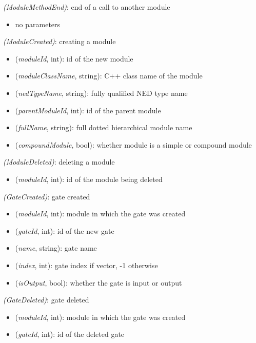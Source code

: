  \textit{(ModuleMethodEnd)}: end of a call to another module

\begin{itemize}
  \item no parameters
\end{itemize}

 \textit{(ModuleCreated)}: creating a module

\begin{itemize}
  \item {} (\textit{moduleId}, int): id of the new module
  \item {} (\textit{moduleClassName}, string): C++ class name of the module
  \item {} (\textit{nedTypeName}, string): fully qualified NED type name
  \item {} (\textit{parentModuleId}, int): id of the parent module
  \item {} (\textit{fullName}, string): full dotted hierarchical module name
  \item {} (\textit{compoundModule}, bool): whether module is a simple or compound module
\end{itemize}

 \textit{(ModuleDeleted)}: deleting a module

\begin{itemize}
  \item {} (\textit{moduleId}, int): id of the module being deleted
\end{itemize}

 \textit{(GateCreated)}: gate created

\begin{itemize}
  \item {} (\textit{moduleId}, int): module in which the gate was created
  \item {} (\textit{gateId}, int): id of the new gate
  \item {} (\textit{name}, string): gate name
  \item {} (\textit{index}, int): gate index if vector, -1 otherwise
  \item {} (\textit{isOutput}, bool): whether the gate is input or output
\end{itemize}

 \textit{(GateDeleted)}: gate deleted

\begin{itemize}
  \item {} (\textit{moduleId}, int): module in which the gate was created
  \item {} (\textit{gateId}, int): id of the deleted gate
\end{itemize}

